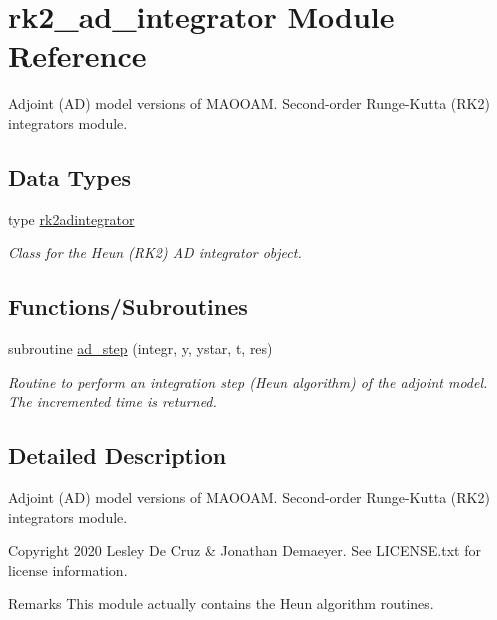 \hypertarget{namespacerk2__ad__integrator}{}\section{rk2\+\_\+ad\+\_\+integrator Module Reference}
\label{namespacerk2__ad__integrator}


Adjoint (AD) model versions of M\+A\+O\+O\+AM. Second-\/order Runge-\/\+Kutta (R\+K2) integrators module.  


\subsection*{Data Types}
\begin{DoxyCompactItemize}
\item 
type \hyperlink{structrk2__ad__integrator_1_1rk2adintegrator}{rk2adintegrator}
\begin{DoxyCompactList}\small\item\em Class for the Heun (R\+K2) AD integrator object. \end{DoxyCompactList}\end{DoxyCompactItemize}
\subsection*{Functions/\+Subroutines}
\begin{DoxyCompactItemize}
\item 
subroutine \hyperlink{namespacerk2__ad__integrator_a6bf98c880e56d52db5658a7a988059d1}{ad\+\_\+step} (integr, y, ystar, t, res)
\begin{DoxyCompactList}\small\item\em Routine to perform an integration step (Heun algorithm) of the adjoint model. The incremented time is returned. \end{DoxyCompactList}\end{DoxyCompactItemize}


\subsection{Detailed Description}
Adjoint (AD) model versions of M\+A\+O\+O\+AM. Second-\/order Runge-\/\+Kutta (R\+K2) integrators module. 

\begin{DoxyCopyright}{Copyright}
2020 Lesley De Cruz \& Jonathan Demaeyer. See L\+I\+C\+E\+N\+S\+E.\+txt for license information. 
\end{DoxyCopyright}
\begin{DoxyRemark}{Remarks}
This module actually contains the Heun algorithm routines. 
\end{DoxyRemark}


